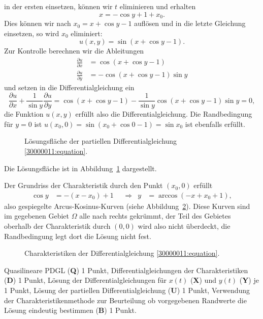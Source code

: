 \begin{loesung}
\begin{teilaufgaben}
in der ersten einsetzen, können wir $t$ eliminieren und erhalten
\[
x=-\cos y+1+x_0.
\]
Dies können wir nach $x_0=x+\cos y-1$ auflösen und in die letzte Gleichung
einsetzen, so wird $x_0$ eliminiert:
\[
u(x,y)=\sin(x+\cos y - 1).
\]
Zur Kontrolle berechnen wir die Ableitungen
\begin{align*}
\frac{\partial u}{\partial x}
&=
\cos(x+\cos y - 1)
\\
\frac{\partial u}{\partial y}
&=
-\cos(x+\cos y - 1)
\sin y
\end{align*}
und setzen in die Differentialgleichung ein
\[
\frac{\partial u}{\partial x}
+
\frac1{\sin y}\frac{\partial u}{\partial y}
=
\cos(x+\cos y - 1)
-
\frac1{\sin y}
\cos(x+\cos y - 1)
\sin y
=
0,
\]
die Funktion $u(x,y)$ erfüllt also die Differentialgleichung. 
Die Randbedingung für $y=0$ ist $u(x_0,0)=\sin(x_0+\cos 0 - 1)=\sin x_0$
ist ebenfalls erfüllt.
\begin{figure}
\centering
{}
\caption{Lösungsfläche der partiellen Differentialgleichung
\eqref{30000011:equation}.
\label{30000011:solution}}
\end{figure}
Die Lösungsfläche ist in Abbildung~\ref{30000011:solution} dargestellt.
\item
Der Grundriss der Charakteristik durch den Punkt $(x_0,0)$ erfüllt
\[
\begin{aligned}
\cos y&=-(x-x_0)+1
&&\Rightarrow&
y&=\arccos(-x+x_0+1),
\end{aligned}
\]
also gespiegelte Arcus-Kosinus-Kurven (siehe Abbildung~\ref{30000011:char}).
Diese Kurven sind im gegebenen Gebiet $\Omega$ alle nach rechts gekrümmt,
der Teil des Gebietes oberhalb der Charakteristik durch $(0,0)$ wird also
nicht überdeckt, die Randbedingung legt dort die Lösung nicht fest.
\qedhere
\begin{figure}
\centering
{}
\caption{Charakteristiken der Differentialgleichung \eqref{30000011:equation}.
\label{30000011:char}}
\end{figure}
\end{teilaufgaben}
\end{loesung}

\begin{bewertung}
Quasilineare PDGL ({\bf Q}) 1 Punkt,
Differentialgleichungen der Charakteristiken ({\bf D}) 1 Punkt,
Lösung der Differentialgleichungen für $x(t)$ ({\bf X})
und $y(t)$ ({\bf Y}) je 1 Punkt,
Lösung der partiellen Differentialgleichung ({\bf U}) 1 Punkt,
Verwendung der Charakteristikenmethode zur Beurteilung ob
vorgegebenen Randwerte die Lösung eindeutig bestimmen ({\bf B}) 1 Punkt.
\end{bewertung}


